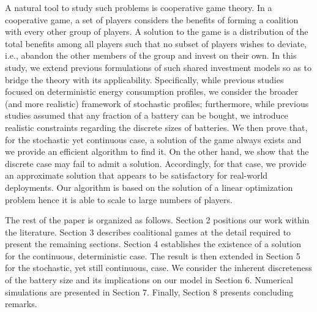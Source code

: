 A natural tool to study such problems is cooperative game theory. In a cooperative game, a set of players considers the benefits of forming a coalition with every other group of players. A solution to the game is a distribution of the total benefits among all players such that no subset of players wishes to deviate, i.e., abandon the other members of the group and invest on their own.
In this study, we extend previous formulations of such shared investment models so as to bridge the theory with its applicability. Specifically, while previous studies focused on deterministic energy consumption profiles, we consider the broader (and more realistic) framework of stochastic profiles; furthermore, while previous studies assumed that any fraction of a battery can be bought, we introduce realistic constraints regarding the discrete sizes of batteries.
We then prove that, for the stochastic yet continuous case, a solution of the game always exists and we provide an efficient algorithm to find it. On the other hand, we show that the discrete case may fail to admit a solution. Accordingly, for that case, we provide an approximate solution that appears to be satisfactory for real-world deployments. 
Our algorithm is based on the solution of a linear optimization problem hence it is able to scale to large numbers of players.

The rest of the paper is organized as follows. Section 2 positions our work within the literature. Section 3 describes coalitional games at the detail required to present the remaining sections.
Section 4 establishes the existence of a solution for the continuous, deterministic case. The result is then extended in Section 5 for the stochastic, yet still continuous, case.
We consider the inherent discreteness of the battery size and its implications on our model in Section 6. Numerical simulations are presented in Section 7. Finally, Section 8 presents concluding remarks.

